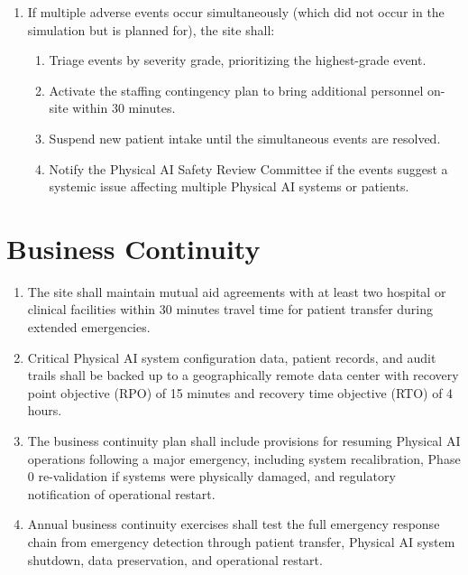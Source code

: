 \begin{enumerate}[label=(\alph*)]
\item If multiple adverse events occur simultaneously (which did not occur in
  the simulation but is planned for), the site shall:
  \begin{enumerate}[label=(\arabic*)]
  \item Triage events by severity grade, prioritizing the highest-grade event.
  \item Activate the staffing contingency plan to bring additional personnel
    on-site within 30 minutes.
  \item Suspend new patient intake until the simultaneous events are resolved.
  \item Notify the Physical AI Safety Review Committee if the events suggest
    a systemic issue affecting multiple Physical AI systems or patients.
  \end{enumerate}
\end{enumerate}

\section{Business Continuity}

\begin{enumerate}[label=(\alph*)]
\item The site shall maintain mutual aid agreements with at least two hospital
  or clinical facilities within 30 minutes travel time for patient transfer
  during extended emergencies.

\item Critical Physical AI system configuration data, patient records, and audit
  trails shall be backed up to a geographically remote data center with
  recovery point objective (RPO) of 15 minutes and recovery time objective
  (RTO) of 4 hours.

\item The business continuity plan shall include provisions for resuming
  Physical AI operations following a major emergency, including system
  recalibration, Phase 0 re-validation if systems were physically damaged,
  and regulatory notification of operational restart.

\item Annual business continuity exercises shall test the full emergency
  response chain from emergency detection through patient transfer, Physical
  AI system shutdown, data preservation, and operational restart.
\end{enumerate}

